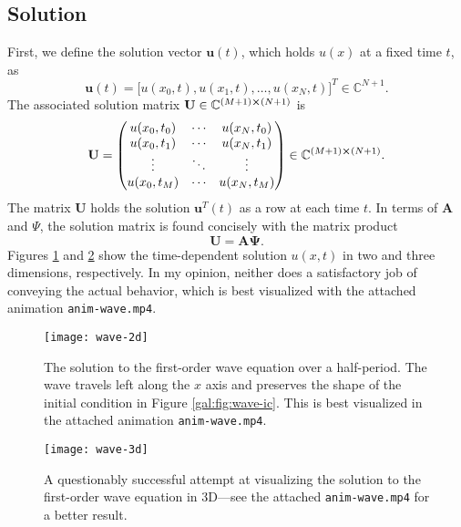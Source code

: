 \documentclass[11pt, a4paper]{article}
\newcommand{\mat}[1]{\mathbf{#1}}
\begin{document}
\subsection{Solution}
First, we define the solution vector $ \bm{u}(t) $, which holds $ u(x) $ at a fixed time $ t $, as
\begin{equation*}
		\bm{u}(t) = \big[u(x_{0}, t), u(x_{1}, t), \ldots, u(x_{N}, t)\big]^{T} \in \mathbb{C}^{N+1}.
\end{equation*}
The associated solution matrix $ \mat{U} \in \mathbb{C}^{(M+1) \cross (N+1)} $ is 
\begin{equation*}
	\mat{U} = 
	\begin{pmatrix}
		u(x_{0}, t_{0}) & \cdots & u(x_{N}, t_{0}) \\
		u(x_{0}, t_{1}) & \cdots & u(x_{N}, t_{1}) \\
		\vdots & \ddots & \vdots \\
		u(x_{0}, t_{M}) & \cdots & u(x_{N}, t_{M})
	\end{pmatrix}
	\in \mathbb{C}^{(M+1) \cross (N+1)}.
\end{equation*}
The matrix $ \mat{U} $ holds the solution $ \bm{u}^{T}(t) $ as a row at each time $ t $. In terms of $ \mat{A} $ and $ \Psi $, the solution matrix is found concisely with the matrix product
\begin{equation*}
	\mat{U} = \mat{A} \mat{\Psi}.
\end{equation*}
Figures \ref{gal:fig:wave-2d} and \ref{gal:fig:wave-3d} show the time-dependent solution $ u(x, t) $ in two and three dimensions, respectively. In my opinion, neither does a satisfactory job of conveying the actual behavior, which is best visualized with the attached animation \texttt{anim-wave.mp4}. 

\begin{figure}
\centering
\texttt{[image: wave-2d]}
\caption{The solution to the first-order wave equation over a half-period. The wave travels left along the $ x $ axis and preserves the shape of the initial condition in Figure \ref{gal:fig:wave-ic}. This is best visualized in the attached animation \texttt{anim-wave.mp4}.}
\label{gal:fig:wave-2d}
\end{figure}

\begin{figure}
\centering
\texttt{[image: wave-3d]}
\caption{A questionably successful attempt at visualizing the solution to the first-order wave equation in 3D---see the attached \texttt{anim-wave.mp4} for a better result.}
\label{gal:fig:wave-3d}
\end{figure}
\end{document}

